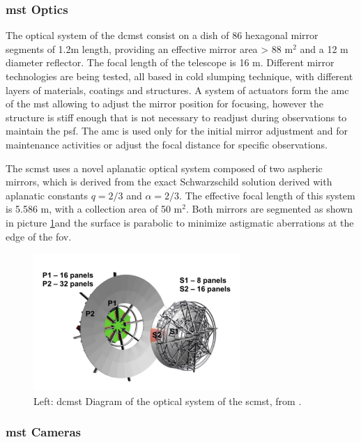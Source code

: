 \documentclass[main.tex]{subfiles}
\begin{document}
\subsubsection{\gls{mst} Optics}

The optical system of the \gls{dcmst} consist on a dish of 86 hexagonal mirror segments of 1.2m length, providing an effective mirror area > 88 m$^2$ and a 12 m diameter reflector. The focal length of the telescope is 16 m.
Different mirror technologies are being tested, all based in cold slumping technique, with different layers of materials, coatings and structures. A system of actuators form the \gls{amc} of the \gls{mst} allowing to adjust the mirror position for focusing, however the structure is stiff enough that is not necessary to readjust during observations to maintain the \gls{psf}. The \gls{amc} is used only for the initial mirror adjustment and for maintenance activities or adjust the focal distance for specific observations.

The \gls{scmst} uses a novel aplanatic optical system composed of two aspheric mirrors, which is derived from the exact Schwarzschild solution derived with aplanatic constants $q=2/3$ and $\alpha = 2/3$. The effective focal length of this system is 5.586 m, with a collection area of 50 m$^2$. Both mirrors are segmented as shown in picture \ref{fig:SCMSTmirrors}and the surface is parabolic to minimize astigmatic aberrations at the edge of the \gls{fov}. 


\begin{figure}
\centering
 \includegraphics[width=0.7\textwidth]{Pictures/SCMSTMirrors.pdf}
  \caption{Left: \gls{dcmst} Diagram of the optical system of the \gls{scmst}, from \cite{2017SCMSTstatus}.}
    \label{fig:SCMSTmirrors}
\end{figure}

\subsubsection{\gls{mst} Cameras}
\end{document}
